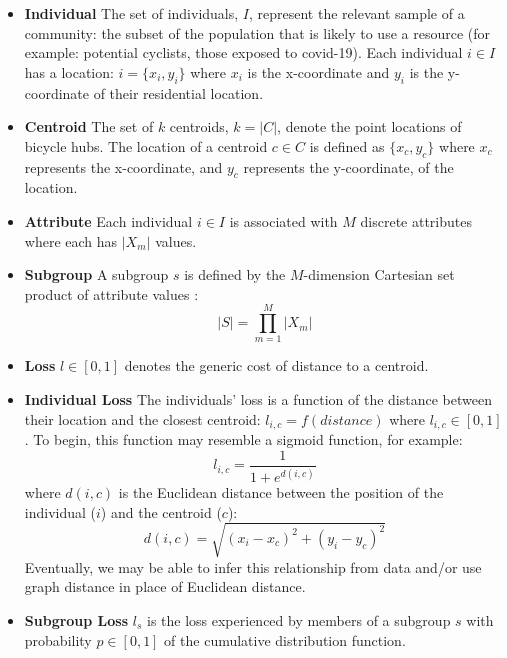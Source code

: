 \documentclass{article}
\begin{document}
\begin{itemize}
    \item \textbf{Individual} The set of individuals, $I$, represent the relevant sample of a community: the subset of the population that is likely to use a resource (for example: potential cyclists, those exposed to covid-19).  Each individual $i \in I$ has a location: $i = \{x_i,y_i\}$ where $x_i$ is the x-coordinate and $y_i$ is the y-coordinate of their residential location. 
    
    \item \textbf{Centroid} The set of $k$ centroids, $k = |C|$, denote the point locations of bicycle hubs. The location of a centroid $c \in C$ is defined as $\{x_c,y_c\}$ where $x_c$ represents the x-coordinate, and $y_c$ represents the y-coordinate, of the location.
    
    \item \textbf{Attribute} Each individual $i \in I$ is associated with $M$ discrete attributes where each has $|X_m|$ values. 
    
    \item \textbf{Subgroup} A subgroup $s$ is defined by the $M$-dimension Cartesian set product of attribute values \cite{zhang2016identifying}:
        \begin{equation}
            |S| = \prod_{m=1}^{M}|X_m|
        \end{equation}
    \item \textbf{Loss} $l \in [0,1]$ denotes the generic cost of distance to a centroid.
    
    \item \textbf{Individual Loss} The individuals' loss is a function of the distance between their location and the closest centroid:  $l_{i,c} = f(distance)$ where $l_{i,c} \in [0,1]$. To begin, this function may resemble a sigmoid function, for example:
        \begin{equation}
        l_{i,c} = \frac{1}{1+e^{d(i,c)}}
        \end{equation}
    where  $d(i,c)$ is the Euclidean distance between the position of the individual ($i$) and the centroid ($c$):
        \begin{equation}
            d(i,c) = \sqrt{(x_i-x_c)^2+(y_i-y_c)^2}
        \end{equation}
    Eventually, we may be able to infer this relationship from data and/or use graph distance in place of Euclidean distance.
    
    \item \textbf{Subgroup Loss} $l_s$ is the loss experienced by members of a subgroup $s$ with probability $p \in [0,1]$ of the cumulative distribution function. 
    

\end{itemize}
\end{document}
